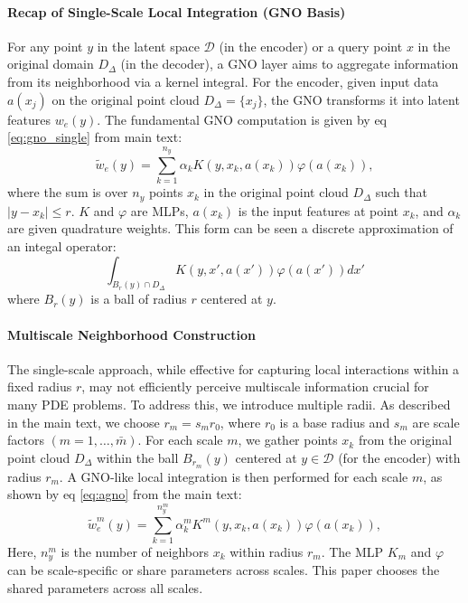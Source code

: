 \documentclass[reqno,10pt]{amsart}
\theoremstyle{plain}
\theoremstyle{definition}
\newcommand{\cal}[1]{\mathcal{#1}}
\begin{document}
\paragraph{\bf Recap of Single-Scale Local Integration (GNO Basis)} For any point $y$ in the latent space $\cal D$ (in the encoder) or a query point $x$ in the original domain $D_\Delta$ (in the decoder), a GNO layer aims to aggregate information from its neighborhood via a kernel integral. For the encoder, given input data $a(x_j)$ on the original point cloud $D_\Delta = \{x_j\}$, the GNO transforms it into latent features $w_e(y)$. The fundamental GNO computation is given by eq \ref{eq:gno_single} from main text:
\begin{equation}
    \tilde{w}_e(y) = \sum_{k=1}^{n_y} \alpha_k K(y,x_k,a(x_k)) \varphi(a(x_k)),
\end{equation}
where the sum is over $n_y$ points $x_k$ in the original point cloud $D_\Delta$ such that $|y-x_k| \leq r$. $K$ and $\varphi$ are MLPs, $a(x_k)$ is the input features at point $x_k$, and $\alpha_k$ are given quadrature weights. This form can be seen a discrete approximation of an integal operator:
\begin{equation}
\int_{B_r(y) \cap D_\Delta} K(y,x',a(x')) \varphi(a(x')) dx'
\end{equation}
where $B_r(y)$ is a ball of radius $r$ centered at $y$.
\paragraph{\bf Multiscale Neighborhood Construction} The single-scale approach, while effective for capturing local interactions within a fixed radius $r$, may not efficiently perceive multiscale information crucial for many PDE problems. To address this, we introduce multiple radii. As described in the main text, we choose $r_m = s_mr_0$, where $r_0$ is a base radius and $s_m$ are scale factors $(m = 1, \dots, \bar{m})$. For each scale $m$, we gather points $x_k$ from the original point cloud $D_\Delta$ within the ball $B_{r_m}(y)$ centered at $y \in \cal D$ (for the encoder) with radius $r_m$. A GNO-like local integration is then performed for each scale $m$, as shown by eq \ref{eq:agno} from the main text:
\begin{equation}
    \tilde{w}_e^m (y) = \sum_{k=1}^{n_y^m} \alpha_k^m K^m (y,x_k,a(x_k)) \varphi(a(x_k)),
\end{equation}
Here, $n_y^m$ is the number of neighbors $x_k$ within radius $r_m$. The MLP $K_m$ and $\varphi$ can be scale-specific or share parameters across scales. This paper chooses the shared parameters across all scales.
\end{document}
